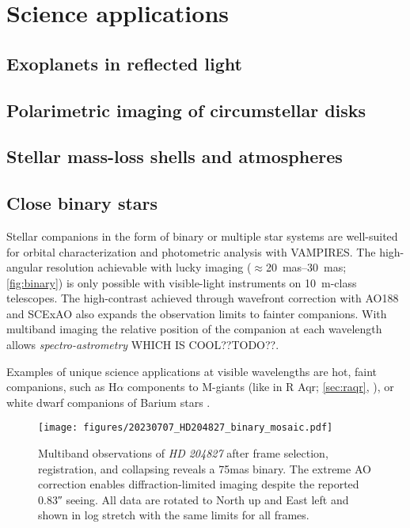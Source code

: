 \section{Science applications}\label{sec:science}

\subsection{Exoplanets in reflected light}

\subsection{Polarimetric imaging of circumstellar disks}

\subsection{Stellar mass-loss shells and atmospheres}

\subsection{Close binary stars}

Stellar companions in the form of binary or multiple star systems are well-suited for orbital characterization and photometric analysis with VAMPIRES. The high-angular resolution achievable with lucky imaging ($\approx$\SIrange{20}{30}{mas}; \autoref{fig:binary}) is only possible with visible-light instruments on \SI{10}{\meter}-class telescopes. The high-contrast achieved through wavefront correction with AO188 and SCExAO also expands the observation limits to fainter companions. With multiband imaging the relative position of the companion at each wavelength allows \textit{spectro-astrometry} WHICH IS COOL??TODO??.

Examples of unique science applications at visible wavelengths are hot, faint companions, such as H$\alpha$ components to M-giants (like in R Aqr; \autoref{sec:raqr}, \citet{schmid_spherezimpol_2017}), or white dwarf companions of Barium stars \citep{mcclure_binary_1980,escorza_barium_2019}.

\begin{figure}
    \centering
    \texttt{[image: figures/20230707\_HD204827\_binary\_mosaic.pdf]}
    \caption{Multiband observations of \textit{HD 204827} after frame selection, registration, and collapsing reveals a \si{75}{mas} binary. The extreme AO correction enables diffraction-limited imaging despite the reported \ang{;;0.83} seeing. All data are rotated to North up and East left and shown in log stretch with the same limits for all frames.\label{fig:binary}}
\end{figure}


